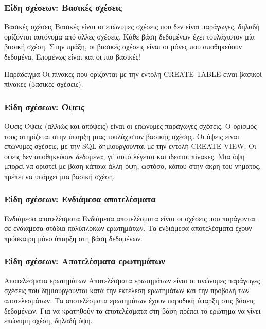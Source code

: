 \begin{frame}
\frametitle{Είδη σχέσεων: Βασικές σχέσεις}
\begin{minipage}{\wE}
  \begin{block}{Βασικές σχέσεις}
    {\crr Βασικές} είναι οι επώνυμες σχέσεις που δεν είναι παράγωγες, δηλαδή ορίζονται αυτόνομα
    από άλλες σχέσεις. Κάθε βάση δεδομένων έχει τουλάχιστον μία βασική
    σχέση. Στην πράξη, οι βασικές σχέσεις είναι οι μόνες που αποθηκεύουν δεδομένα. Επομένως
    είναι και οι πιο βασικές!
  \end{block}
  \begin{exampleblock}{Παράδειγμα}
    Οι πίνακες που ορίζονται με την εντολή {\sq CREATE TABLE}
    είναι βασικοί πίνακες (βασικές σχέσεις). 
  \end{exampleblock}
\end{minipage}
\end{frame}


\begin{frame}
\frametitle{Είδη σχέσεων: Όψεις}
\begin{minipage}{\wE}
  \begin{block}{Όψεις}
    {\crr Όψεις} (αλλιώς και απόψεις) είναι οι επώνυμες παράγωγες σχέσεις. Ο ορισμός τους 
    στηρίζεται στην ύπαρξη μιας τουλάχιστον βασικής σχέσης. Οι όψεις είναι επώνυμες σχέσεις, 
    με την {\sq SQL} δημιουργούνται με την εντολή {\sq CREATE VIEW}. Οι όψεις δεν αποθηκεύουν
    δεδομένα, γι' αυτό λέγεται και ιδεατοί πίνακες. Μια όψη μπορεί να οριστεί με βάση κάποια άλλη
    όψη, ωστόσο, κάπου στην άκρη του νήματος, πρέπει να υπάρχει μια βασική σχέση.
  \end{block}
\end{minipage}
\end{frame}


\begin{frame}
\frametitle{Είδη σχέσεων: Ενδιάμεσα αποτελέσματα}
\begin{minipage}{\wE}
  \begin{block}{Ενδιάμεσα αποτελέσματα}
    {\crr Ενδιάμεσα αποτελέσματα} είναι οι σχέσεις που παράγονται σε ενδιάμεσα στάδια πολύπλοκων
    ερωτημάτων. Τα ενδιάμεσα αποτελέσματα έχουν πρόσκαιρη μόνο ύπαρξη στη βάση δεδομένων.
  \end{block}
\end{minipage}
\end{frame}


\begin{frame}
\frametitle{Είδη σχέσεων: Αποτελέσματα ερωτημάτων}
\begin{minipage}{\wE}
  \begin{block}{Αποτελέσματα ερωτημάτων}
    {\crr Αποτελέσματα ερωτημάτων} είναι οι ανώνυμες παράγωγες σχέσεις που δημιουργούνται κατά
    την εκτέλεση ερωτημάτων και την προβολή των αποτελεσμάτων. 
    Τα αποτελέσματα ερωτημάτων έχουν παροδική ύπαρξη στις βάσεις δεδομένων. 
    Για να κρατηθούν τα αποτελέσματα στη βάση
    πρέπει το ερώτημα να γίνει επώνυμη σχέση, δηλαδή όψη.
  \end{block}
\end{minipage}
\end{frame}


